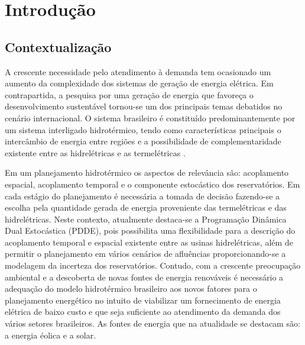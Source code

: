 \chapter{Introdução}
\section{Contextualiza\c c\~ao}
A crescente necessidade pelo atendimento \`a demanda tem ocasionado um aumento da complexidade dos
sistemas de gera\c c\~ao de energia el\'etrica. Em contrapartida, a pesquisa por uma gera\c c\~ao de energia que favore\c
ca o desenvolvimento sustent\'avel tornou-se um dos principais temas debatidos no cen\'ario internacional. O sistema brasileiro \'e constitu\'ido predominantemente por um sistema interligado
hidrot\'ermico, tendo como caracter\'isticas principais o interc\^ambio de energia entre regi\~oes e a possibilidade de
complementaridade existente entre as hidrel\'etricas e as termel\'etricas \cite{tom}. 

Em um planejamento hidrot\'ermico os aspectos
de relev\^ancia s\~ao: acoplamento espacial, acoplamento temporal e o componente estoc\'astico dos reservat\'orios. Em cada
est\'agio do planejamento \'e necess\'aria a tomada de decis\~ao fazendo-se a escolha pela quantidade gerada de energia
proveniente das termel\'etricas e das hidrel\'etricas. Neste
contexto, atualmente destaca-se a Programa\c c\~ao Din\^amica Dual
Estoc\'astica (PDDE), pois possibilita uma flexibilidade para a descri\c c\~ao do acoplamento temporal e espacial existente entre as
usinas hidrel\'etricas, al\'em de permitir o  planejamento em v\'arios cen\'arios de aflu\^encias proporcionando-se a
modelagem da incerteza dos reservat\'orios\cite{an}. Contudo, com a crescente preocupa\c c\~ao ambiental e a descoberta de
novas  fontes de energia renov\'aveis \'e necess\'ario a adequa\c c\~ao do modelo hidrot\'ermico brasileiro aos novos fatores para
o planejamento energ\'etico no intuito de viabilizar um fornecimento de energia el\'etrica de baixo custo e que seja
suficiente ao atendimento da demanda dos v\'arios setores brasileiros. As fontes de energia que na atualidade se
destacam s\~ao: a energia \'eolica e a solar.  

